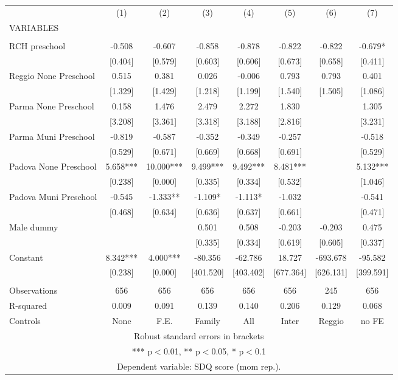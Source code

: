 \begin{tabular}{lccccccc} \hline
 & (1) & (2) & (3) & (4) & (5) & (6) & (7) \\
VARIABLES &  &  &  &  &  &  &  \\ \hline
 &  &  &  &  &  &  &  \\
RCH preschool & -0.508 & -0.607 & -0.858 & -0.878 & -0.822 & -0.822 & -0.679* \\
 & [0.404] & [0.579] & [0.603] & [0.606] & [0.673] & [0.658] & [0.411] \\
Reggio None Preschool & 0.515 & 0.381 & 0.026 & -0.006 & 0.793 & 0.793 & 0.401 \\
 & [1.329] & [1.429] & [1.218] & [1.199] & [1.540] & [1.505] & [1.086] \\
Parma None Preschool & 0.158 & 1.476 & 2.479 & 2.272 & 1.830 &  & 1.305 \\
 & [3.208] & [3.361] & [3.318] & [3.188] & [2.816] &  & [3.231] \\
Parma Muni Preschool & -0.819 & -0.587 & -0.352 & -0.349 & -0.257 &  & -0.518 \\
 & [0.529] & [0.671] & [0.669] & [0.668] & [0.691] &  & [0.529] \\
Padova None Preschool & 5.658*** & 10.000*** & 9.499*** & 9.492*** & 8.481*** &  & 5.132*** \\
 & [0.238] & [0.000] & [0.335] & [0.334] & [0.532] &  & [1.046] \\
Padova Muni Preschool & -0.545 & -1.333** & -1.109* & -1.113* & -1.032 &  & -0.541 \\
 & [0.468] & [0.634] & [0.636] & [0.637] & [0.661] &  & [0.471] \\
Male dummy &  &  & 0.501 & 0.508 & -0.203 & -0.203 & 0.475 \\
 &  &  & [0.335] & [0.334] & [0.619] & [0.605] & [0.337] \\
Constant & 8.342*** & 4.000*** & -80.356 & -62.786 & 18.727 & -693.678 & -95.582 \\
 & [0.238] & [0.000] & [401.520] & [403.402] & [677.364] & [626.131] & [399.591] \\
 &  &  &  &  &  &  &  \\
Observations & 656 & 656 & 656 & 656 & 656 & 245 & 656 \\
R-squared & 0.009 & 0.091 & 0.139 & 0.140 & 0.206 & 0.129 & 0.068 \\
 Controls & None & F.E. & Family & All & Inter & Reggio & no FE \\ \hline
\multicolumn{8}{c}{ Robust standard errors in brackets} \\
\multicolumn{8}{c}{ *** p$<$0.01, ** p$<$0.05, * p$<$0.1} \\
\multicolumn{8}{c}{ Dependent variable: SDQ score (mom rep.).} \\
\end{tabular}
